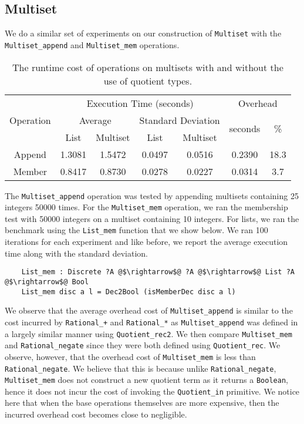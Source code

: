 \documentclass[12pt,twoside,maitrise]{dms}
\theoremstyle{definition}
\numberwithin{equation}{section}
\numberwithin{table}{chapter}
\numberwithin{figure}{chapter}
\newcommand\id[1] {\texttt{#1}}
\begin{document}
\subsection*{Multiset}

We do a similar set of experiments on our construction of \id{Multiset} with the
\id{Multiset\_append} and \id{Multiset\_mem} operations.

\begin{table}[]
\centering
\begin{tabular}{@{}ccccccc@{}}
\toprule
\multirow{3}{*}{Operation} & \multicolumn{4}{c}{Execution Time (seconds)}                         & \multicolumn{2}{c}{Overhead}                   \\ \cmidrule(l){2-7}
                           & \multicolumn{2}{c}{Average} & \multicolumn{2}{c}{Standard Deviation} & \multirow{2}{*}{seconds} & \multirow{2}{*}{\%} \\
       & List   & Multiset & List   & Multiset &        &      \\ \midrule
Append & 1.3081 & 1.5472   & 0.0497 & 0.0516   & 0.2390 & 18.3 \\
Member & 0.8417 & 0.8730   & 0.0278 & 0.0227   & 0.0314 & 3.7  \\ \bottomrule
\end{tabular}
\caption{The runtime cost of operations on multisets with and without the use of quotient types.}\label{tab:benchmark-multiset}
\end{table}

The \id{Multiset\_append} operation was tested by appending multisets containing
25 integers 50000 times. For the \id{Multiset\_mem} operation, we ran the
membership test with 50000 integers on a multiset containing 10 integers. For
lists, we ran the benchmark using the \id{List\_mem} function that we show
below. We ran 100 iterations for each experiment and like before, we report the
average execution time along with the standard deviation.

\begin{verbatim}
    List_mem : Discrete ?A @$\rightarrow$@ ?A @$\rightarrow$@ List ?A @$\rightarrow$@ Bool
    List_mem disc a l = Dec2Bool (isMemberDec disc a l)
\end{verbatim}

We observe that the average overhead cost of \id{Multiset\_append} is similar to
the cost incurred by \id{Rational\_+} and \id{Rational\_*} as
\id{Multiset\_append} was defined in a largely similar manner using
\id{Quotient\_rec2}. We then compare \id{Multiset\_mem} and
\id{Rational\_negate} since they were both defined using \id{Quotient\_rec}. We
observe, however, that the overhead cost of \id{Multiset\_mem} is less than
\id{Rational\_negate}. We believe that this is because unlike
\id{Rational\_negate}, \id{Multiset\_mem} does not construct a new quotient term
as it returns a \id{Boolean}, hence it does not incur the cost of invoking the
\id{Quotient\_in} primitive. We notice here that when the base operations
themselves are more expensive, then the incurred overhead cost becomes close to
negligible.
\end{document}
